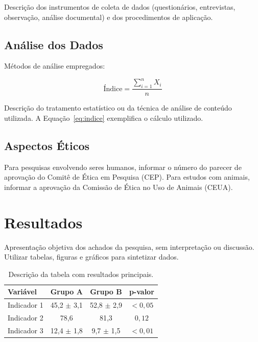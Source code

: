 \documentclass[preprint,12pt,review]{elsarticle}
\begin{document}
Descrição dos instrumentos de coleta de dados (questionários, entrevistas,
observação, análise documental) e dos procedimentos de aplicação.

\subsection{Análise dos Dados}

Métodos de análise empregados:

\begin{equation}
  \text{Índice} = \frac{\sum_{i=1}^{n} X_i}{n}
  \label{eq:indice}
\end{equation}

Descrição do tratamento estatístico ou da técnica de análise de conteúdo
utilizada. A Equação~\ref{eq:indice} exemplifica o cálculo utilizado.

\subsection{Aspectos Éticos}

Para pesquisas envolvendo seres humanos, informar o número do parecer de
aprovação do Comitê de Ética em Pesquisa (CEP). Para estudos com animais,
informar a aprovação da Comissão de Ética no Uso de Animais (CEUA).

\section{Resultados}

Apresentação objetiva dos achados da pesquisa, sem interpretação ou
discussão. Utilizar tabelas, figuras e gráficos para sintetizar dados.

\begin{table}[H]
\centering
\caption{Descrição da tabela com resultados principais.}
\label{tab:resultados}
\begin{tabular}{lccc}
\toprule
\textbf{Variável} & \textbf{Grupo A} & \textbf{Grupo B} & \textbf{p-valor} \\
\midrule
Indicador 1 & 45,2 $\pm$ 3,1 & 52,8 $\pm$ 2,9 & $< 0,05$ \\
Indicador 2 & 78,6 & 81,3 & $0,12$ \\
Indicador 3 & 12,4 $\pm$ 1,8 & 9,7 $\pm$ 1,5 & $< 0,01$ \\
\bottomrule
\end{tabular}
\end{table}
\end{document}
